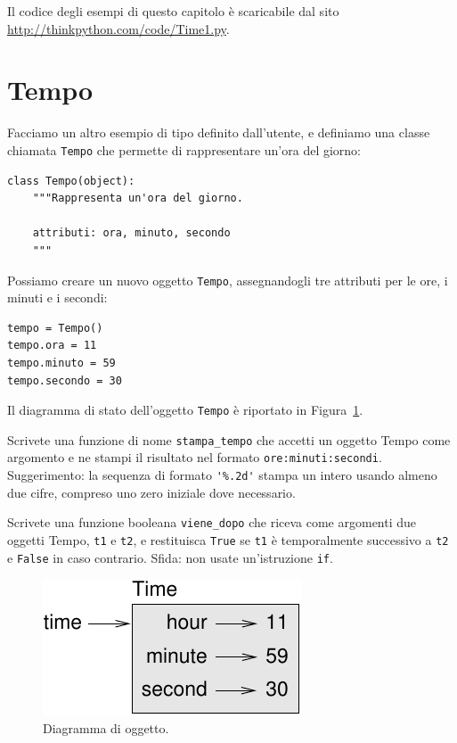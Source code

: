 \documentclass[10pt]{book}
\begin{document}
Il codice degli esempi di questo capitolo è scaricabile dal sito
\url{http://thinkpython.com/code/Time1.py}.

\section{Tempo}
\label{time.object}

Facciamo un altro esempio di tipo definito dall'utente, e definiamo una classe chiamata {\tt Tempo} che permette di rappresentare un'ora del giorno:

\begin{verbatim}
class Tempo(object):
    """Rappresenta un'ora del giorno.
       
    attributi: ora, minuto, secondo
    """
\end{verbatim}
%
Possiamo creare un nuovo oggetto {\tt Tempo}, assegnandogli tre attributi per le
ore, i minuti e i secondi:

\begin{verbatim}
tempo = Tempo()
tempo.ora = 11
tempo.minuto = 59
tempo.secondo = 30
\end{verbatim}
%
Il diagramma di stato dell'oggetto {\tt Tempo} è riportato in Figura~\ref{fig.time}.

\vspace{0.2in}
\begin{exercise}
\label{ex.printtime}

Scrivete una funzione di nome \verb"stampa_tempo" che accetti un oggetto
Tempo come argomento e ne stampi il risultato nel formato {\tt ore:minuti:secondi}.
Suggerimento: la sequenza di formato \verb"'%.2d'" stampa un intero usando almeno due cifre, compreso uno zero iniziale dove necessario.

\end{exercise}

\vspace{0.2in}
\begin{exercise}
\label{isafter}

Scrivete una funzione booleana \verb"viene_dopo" che riceva come argomenti due oggetti Tempo, {\tt t1} e {\tt t2}, e restituisca {\tt True} se {\tt t1} è temporalmente successivo a {\tt t2} e {\tt False} in caso contrario.  Sfida: non usate un'istruzione {\tt if}.
\end{exercise}

\begin{figure}
\centerline
{\includegraphics[scale=0.8]{figs/time.pdf}}
\caption{Diagramma di oggetto.}
\label{fig.time}
\end{figure}
\end{document}
